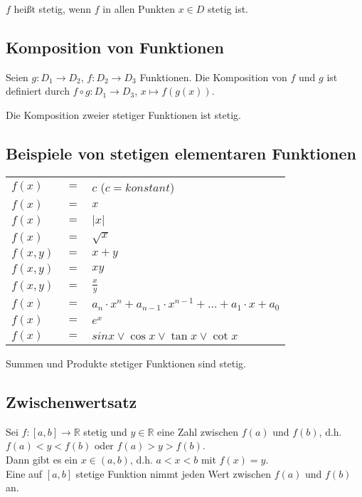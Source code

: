\documentclass[a4paper,9pt]{extarticle}
\begin{document}
	$f$ heißt stetig, wenn $f$ in allen Punkten $x \in D$ stetig ist.

	\subsection*{Komposition von Funktionen}

	Seien $g: D_1 \to D_2$, $f: D_2 \to D_3$ Funktionen. Die Komposition von $f$ und $g$ ist definiert durch $f \circ g: D_1 \to D_3$, $x \mapsto f(g(x))$.

	Die Komposition zweier stetiger Funktionen ist stetig.

	\subsection*{Beispiele von stetigen elementaren Funktionen}

	\begin{tabular}{lcl}
		$f(x)$ & $=$ & $c$ ($c=konstant$) \\
		$f(x)$ & $=$ & $x$ \\
		$f(x)$ & $=$ & $|x|$ \\ [1ex]
		$f(x)$ & $=$ & $\sqrt{x}$ \\ [1ex]
		$f(x, y)$ & $=$ & $x + y$ \\ [1ex]
		$f(x, y)$ & $=$ & $x y$ \\ [1ex]
		$f(x, y)$ & $=$ & $\frac{x}{y}$ \\ [1ex]
		$f(x)$ & $=$ & $a_n⋅x^n + a_{n-1}⋅x^{n-1} + \dots + a_1⋅x + a_0$ \\
		$f(x)$ & $=$ & $e^x$ \\
		$f(x)$ & $=$ & $sin x \lor \cos x \lor \tan x \lor \cot x$
	\end{tabular}

	Summen und Produkte stetiger Funktionen sind stetig.

	\subsection*{Zwischenwertsatz}

	Sei $f: [a, b] \to \mathbb{R}$ stetig und $y \in \mathbb{R}$ eine Zahl zwischen $f(a)$ und $f(b)$, d.h. $f(a) < y < f(b)$ oder $f(a) > y > f(b)$. \\
	Dann gibt es ein $x \in (a, b)$, d.h. $a < x < b$ mit $f(x) = y$. \\

	Eine auf $[a, b]$ stetige Funktion nimmt jeden Wert zwischen $f(a)$ und $f(b)$ an.
	
\end{document}
